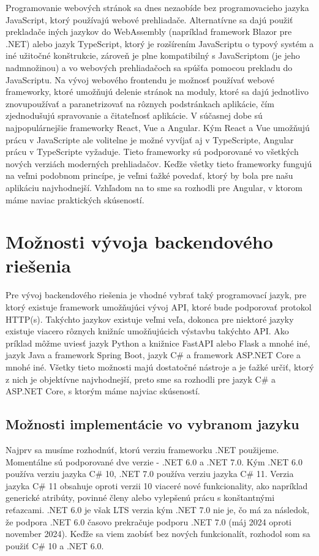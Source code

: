 Programovanie webových stránok sa dnes nezaobíde bez programovacieho jazyka JavaScript, ktorý používajú webové prehliadače. Alternatívne 
sa dajú použiť prekladače iných jazykov do WebAssembly (napríklad framework Blazor pre .NET) alebo jazyk TypeScript, ktorý je rozšírením JavaScriptu o typový 
systém a iné užitočné konštrukcie, zároveň je plne kompatibilný s JavaScriptom (je jeho nadmnožinou) a vo webových prehliadačoch sa spúšťa pomocou 
prekladu do JavaScriptu. Na vývoj webového frontendu je možnosť používať webové frameworky, ktoré umožňujú delenie stránok na moduly, 
ktoré sa dajú jednotlivo znovupoužívať a paranetrizovať na rôznych podstránkach aplikácie, čím zjednodušujú spravovanie a čitateľnosť aplikácie. 
V súčasnej dobe sú najpopulárnejšie frameworky React, Vue a Angular. Kým React a Vue umožňujú prácu v JavaScripte ale volitelne je možné vyvíjať 
aj v TypeScripte, Angular prácu v TypeScripte vyžaduje. Tieto frameworky sú podporované vo všetkých nových verziách moderných prehliadačov. 
Keďže všetky tieto frameworky fungujú na veľmi podobnom princípe, je veľmi ťažké povedať, ktorý by bola pre našu aplikáciu najvhodnejší. Vzhľadom 
na to sme sa rozhodli pre Angular, v ktorom máme naviac praktických skúseností.

\section{Možnosti vývoja backendového riešenia}

Pre vývoj backendového riešenia je vhodné vybrať taký programovací jazyk, pre ktorý existuje framework umožňujúci vývoj API, ktoré bude podporovať 
protokol HTTP(s). Takýchto jazykov existuje veľmi veľa, dokonca pre niektoré jazyky existuje viacero rôznych knižníc umožňujúcich výstavbu 
takýchto API. Ako príklad môžme uviesť jazyk Python a knižnice FastAPI alebo Flask a mnohé iné, jazyk Java a framework Spring Boot, jazyk C\# a 
framework ASP.NET Core a mnohé iné. Všetky tieto možnosti majú dostatočné nástroje a je ťažké určiť, ktorý z nich je objektívne najvhodnejší, 
preto sme sa rozhodli pre jazyk C\# a ASP.NET Core, s ktorým máme najviac skúseností.

\subsection{Možnosti implementácie vo vybranom jazyku}

Najprv sa musíme rozhodnúť, ktorú verziu frameworku .NET použijeme. Momentálne sú podporované dve verzie - .NET 6.0 a .NET 7.0. Kým .NET 6.0 
používa verziu jazyka C\# 10, .NET 7.0 používa verziu jazyka C\# 11. Verzia jazyka C\# 11 obsahuje oproti verzii 10 viaceré nové funkcionality,
ako napríklad generické atribúty, povinné členy alebo vylepšenú prácu s konštantnými reťazcami. .NET 6.0 je však LTS verzia kým .NET 7.0 nie je, 
čo má za následok, že podpora .NET 6.0 časovo prekračuje podporu .NET 7.0 (máj 2024 oproti november 2024). Keďže sa viem zaobísť bez nových 
funkcionalít, rozhodol som sa použiť C\# 10 a .NET 6.0.

